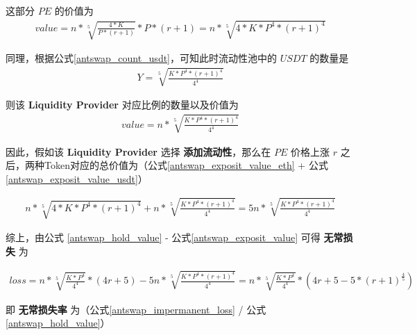 \documentclass{article}
\begin{document}
这部分 $PE$ 的价值为
\begin{equation} \label{antswap_exposit_value_eth}
\begin{split}
value = n * \sqrt[5]{\frac{4*K}{P * (r + 1)}} * P * (r + 1) = n * \sqrt[5]{4*K * P^4 * (r + 1)^4}
\end{split}
\end{equation}

同理，根据公式\ref{antswap_count_usdt}，可知此时流动性池中的 $USDT$ 的数量是
\begin{equation*}
\begin{split}
Y = \sqrt[5]{\frac{K * P^4 * (r + 1)^4}{4^4}}
\end{split}
\end{equation*}

则该 \textbf{Liquidity Provider} 对应比例的数量以及价值为
\begin{equation} \label{antswap_exposit_value_usdt}
\begin{split}
value = n * \sqrt[5]{\frac{K * P^4 * (r + 1)^4}{4^4}}
\end{split}
\end{equation}


因此，假如该 \textbf{Liquidity Provider} 选择 \textbf{添加流动性}，那么在 $PE$ 价格上涨 $r$ 之后，两种Token对应的总价值为（公式\ref{antswap_exposit_value_eth} + 公式\ref{antswap_exposit_value_usdt}）

\begin{equation} \label{antswap_exposit_value}
\begin{split}
n * \sqrt[5]{4*K * P^4 * (r + 1)^4} + n * \sqrt[5]{\frac{K * P^4 * (r + 1)^4}{4^4}} = 5n * \sqrt[5]{\frac{K * P^4 * (r + 1)^4}{4^4}}
\end{split}
\end{equation}


综上，由公式 \ref{antswap_hold_value} - 公式\ref{antswap_exposit_value} 可得 \textbf{无常损失} 为

\begin{equation} \label{antswap_impermanent_loss}
\begin{split}
loss = n * \sqrt[5]{\frac{K * P^4}{4 ^4}} * (4r + 5) - 5n * \sqrt[5]{\frac{K * P^4 * (r + 1)^4}{4^4}} 
= n * \sqrt[5]{\frac{K * P^4}{4^4}} * (4r + 5 - 5 * (r + 1)^\frac{4}{5})
\end{split}
\end{equation}

即 \textbf{无常损失率} 为（公式\ref{antswap_impermanent_loss} / 公式\ref{antswap_hold_value}）
\end{document}
